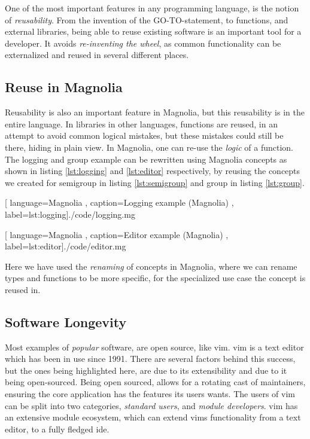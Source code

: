 One of the most important features in any programming language, is the notion
of \textit{reusability}. From the invention of the GO-TO-statement,
to functions, and external libraries, being able to reuse existing software is
an important tool for a developer. It avoids \textit{re-inventing the wheel}, as
common functionality can be externalized and reused in several different places.

\subsection{Reuse in Magnolia}

Reusability is also an important feature in Magnolia, but this reusability is in
the entire language. In libraries in other languages, functions are reused, in
an attempt to avoid common logical mistakes, but these mistakes could still be
there, hiding in plain view. In Magnolia, one can re-use the \textit{logic} of a
function. The logging and group example can be rewritten using Magnolia concepts
as shown in listing \ref{lst:logging} and \ref{lst:editor} respectively, by
reusing the concepts we created for semigroup in listing \ref{lst:semigroup} and group
in listing \ref{lst:group}.

\begin{center}
  
    [ language=Magnolia
    , caption={Logging example (Magnolia)}
    , label=lst:logging]{./code/logging.mg}
\end{center}

\begin{center}
  
    [ language=Magnolia
    , caption={Editor example (Magnolia)}
    , label=lst:editor]{./code/editor.mg}
\end{center}

Here we have used the \textit{renaming} of concepts in Magnolia, where we can
rename types and functions to be more specific, for the specialized use case the
concept is reused in.

\subsection{Software Longevity}

Most examples of \textit{popular} software, are open source, like \gls{vim}.
\gls{vim} is a text editor which has been in use since 1991. There are several
factors behind this success, but the ones being highlighted here, are due to its
extensibility and due to it being open-sourced. Being open sourced, allows for a
rotating cast of maintainers, ensuring the core application has the features its
users wants. The users of \gls{vim} can be split into two categories,
\textit{standard users}, and \textit{module developers}. \gls{vim} has an
extensive module ecosystem, which can extend \gls{vim}s functionality from a
text editor, to a fully fledged \gls{ide}.

